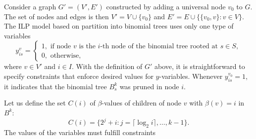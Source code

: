 Consider a graph $G'=(V',E')$ constructed  by adding a universal node $v_0$ to $G$. 
The set of nodes and edges is then $V'=V\cup \{v_0\}$ and $E'=E\cup\{\{v_0,v\}:v\in V\}$.
The ILP model based on partition into binomial trees uses only one type of variables
$$
y_{is}^v=\begin{cases}
1, \text{ if  node } v \text{ is the } i\text{-th node of the binomial tree rooted at } s\in S,\\
0, \text{ otherwise},
\end{cases}
$$
where $v\in V'$ and $i\in I $. 
With the definition of $G'$ above, it is straightforward to specify constraints that enforce desired values for $y$-variables.
Whenever $y_{is}^{v_0}=1$, it indicates that the binomial tree $B^k_s$ was pruned in node $i$.

Let us define the set $C(i)$ of $\beta$-values of children of node $v$ with $\beta(v)=i$ in $B^k$:
\begin{equation}
C(i)=\{2^j+i:j=\lceil\log_2 i\rceil,\dots,k-1\}.
\end{equation}
The values of the variables must fulfill constraints

